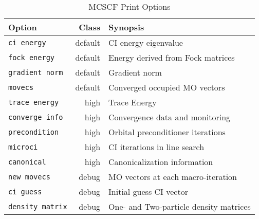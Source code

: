 \begin{table}[htb]

\label{MCSCF_print_options}

\center

\vspace{.2in}
\begin{tabular}{lrl}
\hline\hline
Option                          & Class    &  Synopsis \\
\hline
\verb+ci energy+                & default  &  CI energy eigenvalue \\
\verb+fock energy+              & default  &  Energy derived from Fock matrices \\
\verb+gradient norm+            & default  &  Gradient norm \\
\verb+movecs+                   & default  &  Converged occupied MO vectors \\
\verb+trace energy+             & high     &  Trace Energy \\
\verb+converge info+            & high     &  Convergence data and monitoring \\
\verb+precondition+             & high     &  Orbital preconditioner iterations \\
\verb+microci+                  & high     &  CI iterations in line search \\
\verb+canonical+                & high     &  Canonicalization information \\
\verb+new movecs+               & debug    &  MO vectors at each macro-iteration \\
\verb+ci guess+                 & debug    &  Initial guess CI vector \\
\verb+density matrix+           & debug    &  One- and Two-particle density matrices \\
\hline\hline
\end{tabular}

\caption{MCSCF Print Options}

\end{table}


